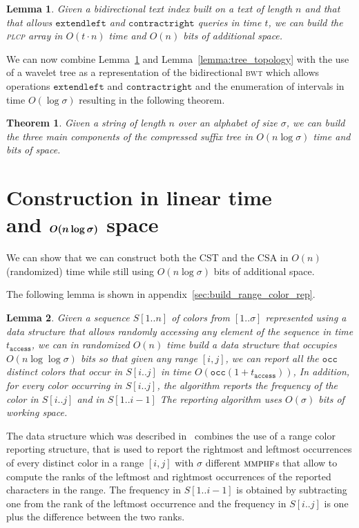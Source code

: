 \documentclass[a4paper]{article}
\newtheorem{lemma}{Lemma}
\newtheorem{theorem}{Theorem}
\begin{document}
\begin{lemma}
\label{lemma:plcp}
Given a bidirectional text index built on a text of length $n$ and that that allows $\mathtt{extendleft}$ and $\mathtt{contractright}$ queries in time $t$, we can build the \textsc{plcp} array in $O(t\cdot n)$ time and $O(n)$ bits of 
additional space. 
\end{lemma}
We can now combine Lemma~\ref{lemma:plcp} and Lemma~\ref{lemma:tree_topology} with the use of a wavelet tree as a representation of the bidirectional \textsc{bwt} which allows operations $\mathtt{extendleft}$ and $\mathtt{contractright}$ and the enumeration of intervals in time $O(\log\sigma)$ resulting in the following theorem. 
\begin{theorem}
Given a string of length $n$ over an alphabet of size $\sigma$, we can build the three main components of the compressed suffix tree in $O(n\log\sigma)$ time and bits of space. 
\end{theorem}




\section{Construction in linear time\\ and {\large $\boldsymbol{O(\lowercase{n}\log\sigma)}$} space}
\label{sec:big_alpha_build}

We can show that we can construct both the \textsc{CST} and the \textsc{CSA} in $O(n)$ (randomized) time while still using $O(n\log\sigma)$ bits of additional space. 


The following lemma is shown in appendix~\ref{sec:build_range_color_rep}. 
\begin{lemma}
\label{lemma:build_range_color_report1}
Given a sequence $S[1..n]$ of colors from $[1..\sigma]$ represented 
using a data structure that allows randomly accessing any element 
of the sequence in time $t_{\mathtt{access}}$, we can 
in randomized $O(n)$ time build a data structure that occupies 
$O(n\log\log\sigma)$ bits so that 
given any range $[i,j]$, we can report all the $\mathtt{occ}$ distinct
colors that occur in $S[i..j]$ in time $O(\mathtt{occ}(1+t_{\mathtt{access}}))$, 
In addition, for every color occurring in $S[i..j]$, the algorithm reports 
the frequency of the color in $S[i..j]$ and in $S[1..i-1]$
The reporting algorithm uses $O(\sigma)$ bits of working space. 
\end{lemma}
The data structure which was described in~\cite{BNV13} combines the use of a 
range color reporting structure, that is used to report the rightmost 
and leftmost occurrences of every distinct color in a range $[i,j]$ with $\sigma$
different $\textsc{mmphf}$s that allow to compute the ranks 
of the leftmost and rightmost occurrences of the reported characters
in the range.
The frequency in $S[1..i-1]$ is obtained by subtracting one 
from the rank of the leftmost occurrence and the frequency in $S[i..j]$ is one 
plus the difference between the two ranks. 
\end{document}
